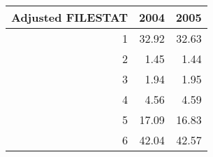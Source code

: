 \begin{tabular}{rrr}
\hline\hline
\textbf{Adjusted FILESTAT} & \textbf{2004} & \textbf{2005} \\\hline
1 & 32.92 & 32.63 \\
2 & 1.45 & 1.44 \\
3 & 1.94 & 1.95 \\
4 & 4.56 & 4.59 \\
5 & 17.09 & 16.83 \\
6 & 42.04 & 42.57 \\\hline\hline
\end{tabular}
